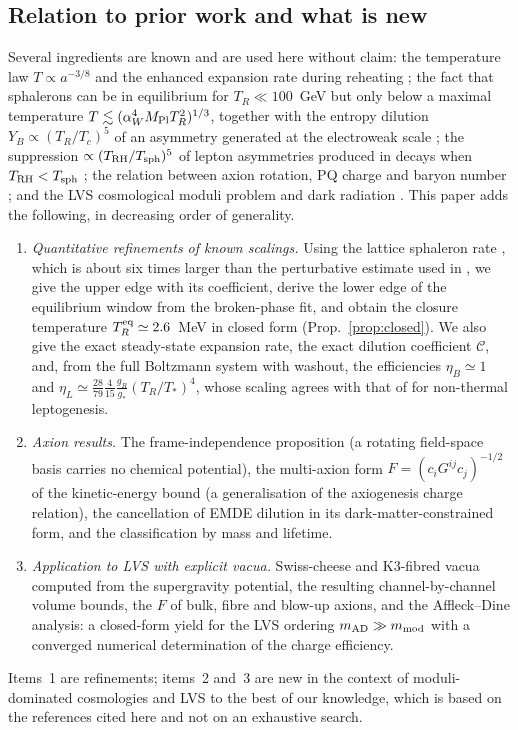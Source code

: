 \documentclass[11pt]{article}
\newcommand{\MP}{M_{\rm Pl}}
\begin{document}
\subsection*{Relation to prior work and what is new}
Several ingredients are known and are used here without claim: the temperature law $T\propto a^{-3/8}$ and the enhanced expansion rate during reheating \cite{Giudice:2000}; the fact that sphalerons can be in equilibrium for $T_R\ll100$~GeV but only below a maximal temperature $T\lesssim(\alpha_W^4\MP T_R^2)^{1/3}$, together with the entropy dilution $Y_B\propto(T_R/T_c)^5$ of an asymmetry generated at the electroweak scale \cite{DLR:2000,McDonald:1991}; the suppression $\propto(T_{\rm RH}/T_{\rm sph})^5$ of lepton asymmetries produced in decays when $T_{\rm RH}<T_{\rm sph}$ \cite{GHKO:2026}; the relation between axion rotation, PQ charge and baryon number \cite{Co:2019,Snowmass:2022,Asadi:2025}; and the LVS cosmological moduli problem and dark radiation \cite{Choi:2012,Cicoli:2012,Higaki:2012}. This paper adds the following, in decreasing order of generality.
\begin{enumerate}
\item \emph{Quantitative refinements of known scalings.} Using the lattice sphaleron rate \cite{DRT:2014}, which is about six times larger than the perturbative estimate used in \cite{DLR:2000}, we give the upper edge with its coefficient, derive the lower edge of the equilibrium window from the broken-phase fit, and obtain the closure temperature $T_R^{\rm eq}\simeq2.6$~MeV in closed form (Prop.~\ref{prop:closed}). We also give the exact steady-state expansion rate, the exact dilution coefficient $\mathcal C$, and, from the full Boltzmann system with washout, the efficiencies $\eta_B\simeq1$ and $\eta_L\simeq\tfrac{28}{79}\tfrac{4}{15}\tfrac{g_R}{g_*}(T_R/T_*)^4$, whose scaling agrees with that of \cite{GHKO:2026} for non-thermal leptogenesis.
\item \emph{Axion results.} The frame-independence proposition (a rotating field-space basis carries no chemical potential), the multi-axion form $F=(c_iG^{ij}c_j)^{-1/2}$ of the kinetic-energy bound (a generalisation of the axiogenesis charge relation), the cancellation of EMDE dilution in its dark-matter-constrained form, and the classification by mass and lifetime.
\item \emph{Application to LVS with explicit vacua.} Swiss-cheese and K3-fibred vacua computed from the supergravity potential, the resulting channel-by-channel volume bounds, the $F$ of bulk, fibre and blow-up axions, and the Affleck--Dine analysis: a closed-form yield for the LVS ordering $m_{\rm AD}\gg m_{\rm mod}$ with a converged numerical determination of the charge efficiency.
\end{enumerate}
Items~1 are refinements; items~2 and~3 are new in the context of moduli-dominated cosmologies and LVS to the best of our knowledge, which is based on the references cited here and not on an exhaustive search.
\end{document}
